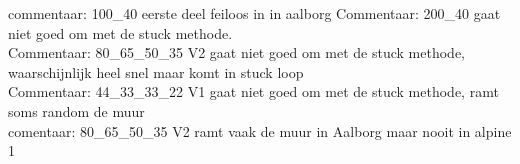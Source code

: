 \documentclass[pt,twoside,a4paper]{article}
\begin{document}
commentaar:  100\_40 eerste deel feiloos in in aalborg
Commentaar: 200\_40 gaat niet goed om met de stuck methode.\\
Commentaar: 80\_65\_50\_35 V2 gaat niet goed om met de stuck methode, waarschijnlijk heel snel maar komt in stuck loop\\
Commentaar: 44\_33\_33\_22 V1 gaat niet goed om met de stuck methode, ramt soms random de muur \\
comentaar: 80\_65\_50\_35 V2 ramt vaak de muur in Aalborg maar nooit in alpine 1\\

\newpage
\end{document}
